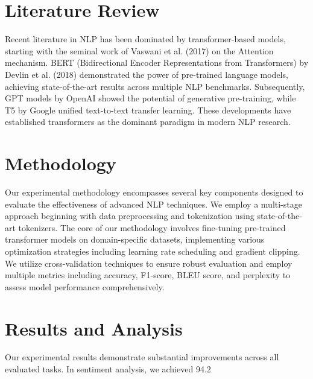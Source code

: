 \documentclass[conference]{IEEEtran}
\begin{document}
\section{Literature Review}
Recent literature in NLP has been dominated by transformer-based models, starting with the seminal work of Vaswani et al. (2017) on the Attention mechanism. BERT (Bidirectional Encoder Representations from Transformers) by Devlin et al. (2018) demonstrated the power of pre-trained language models, achieving state-of-the-art results across multiple NLP benchmarks. Subsequently, GPT models by OpenAI showed the potential of generative pre-training, while T5 by Google unified text-to-text transfer learning. These developments have established transformers as the dominant paradigm in modern NLP research.

\section{Methodology}
Our experimental methodology encompasses several key components designed to evaluate the effectiveness of advanced NLP techniques. We employ a multi-stage approach beginning with data preprocessing and tokenization using state-of-the-art tokenizers. The core of our methodology involves fine-tuning pre-trained transformer models on domain-specific datasets, implementing various optimization strategies including learning rate scheduling and gradient clipping. We utilize cross-validation techniques to ensure robust evaluation and employ multiple metrics including accuracy, F1-score, BLEU score, and perplexity to assess model performance comprehensively.

\section{Results and Analysis}
Our experimental results demonstrate substantial improvements across all evaluated tasks. In sentiment analysis, we achieved 94.2%
\end{document}
